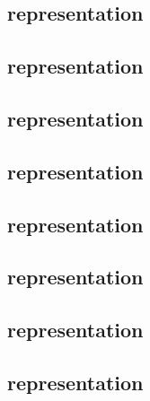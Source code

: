 \subsection{ representation}  \label{bls: lua: pointevaluation} 
\subsection{ representation}              \label{bls: lua: g1add}           
\subsection{ representation}              \label{bls: lua: g1msm}           
\subsection{ representation}              \label{bls: lua: g2add}           
\subsection{ representation}              \label{bls: lua: g2msm}           
\subsection{ representation}     \label{bls: lua: pairingcheck}    
\subsection{ representation}    \label{bls: lua: fptog1}          
\subsection{ representation}   \label{bls: lua: fp2tog2}         
